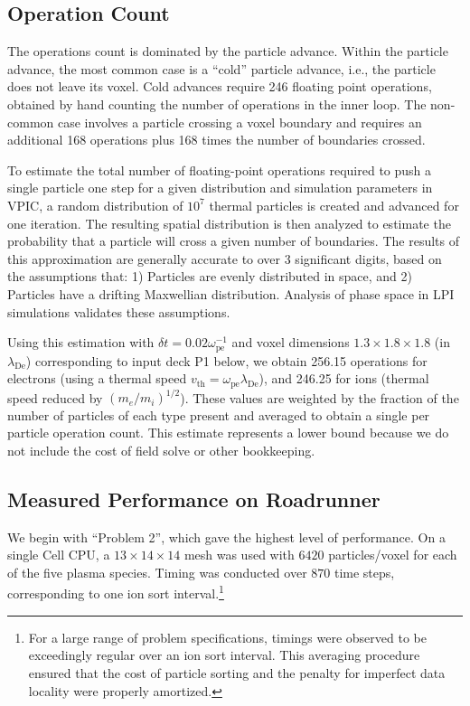 \documentclass[journal,twoside]{IEEEtran}
\newcommand{\lde}      {\lambda_{\mathrm{De}}}
\newcommand{\wpe}      {\omega_{\mathrm{pe}}}
\begin{document}
\subsection{Operation Count}

The operations count is dominated by the particle advance.  Within the
particle advance, the most common case is a ``cold'' particle advance,
i.e., the particle does not leave its voxel.  Cold advances require
246 floating point operations, obtained by hand counting the number of
operations in the inner loop.  The non-common case involves a particle
crossing a voxel boundary and requires an additional 168 operations
plus 168 times the number of boundaries crossed.

To estimate the total number of floating-point operations required to
push a single particle one step for a given distribution and
simulation parameters in VPIC, a random distribution of $10^7$ thermal
particles is created and advanced for one iteration.  The resulting
spatial distribution is then analyzed to estimate the probability that
a particle will cross a given number of boundaries.  The results of
this approximation are generally accurate to over 3 significant
digits, based on the assumptions that: 1) Particles are evenly
distributed in space, and 2) Particles have a drifting Maxwellian
distribution.  Analysis of phase space in LPI simulations validates
these assumptions.~\cite{Yin_et_al_Phys_Plasmas_2007_SRS}

Using this estimation with $\delta t = 0.02 \wpe^{-1}$ and voxel
dimensions $1.3 \times 1.8 \times 1.8$ (in $\lde$) corresponding to
input deck P1 below, we obtain 256.15 operations for electrons (using
a thermal speed $v_{\mathrm{th}} = \wpe \lde$), and 246.25 for ions
(thermal speed reduced by $(m_e/m_i)^{1/2}$).  These values are
weighted by the fraction of the number of particles of each type
present and averaged to obtain a single per particle operation count.
This estimate represents a lower bound because we do not include the
cost of field solve or other bookkeeping.

\subsection{Measured Performance on Roadrunner}

We begin with ``Problem 2'', which gave the highest level of
performance.  On a single Cell CPU, a $13 \times 14 \times 14$ mesh
was used with $6420$ particles/voxel for each of the five plasma
species.  Timing was conducted over $870$ time steps, corresponding to
one ion sort interval.\footnote{For a large range of problem
specifications, timings were observed to be exceedingly regular over
an ion sort interval.  This averaging procedure ensured that the cost
of particle sorting and the penalty for imperfect data locality were
properly amortized.}
\end{document}
